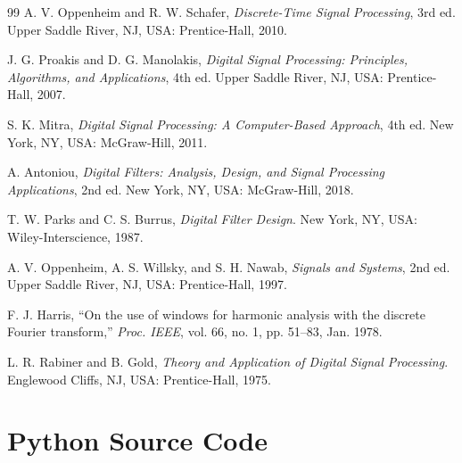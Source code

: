 \documentclass[12pt, a4paper]{article}
\begin{document}
\begin{thebibliography}{99}
A. V. Oppenheim and R. W. Schafer, \textit{Discrete-Time Signal Processing}, 3rd ed. Upper Saddle River, NJ, USA: Prentice-Hall, 2010.

J. G. Proakis and D. G. Manolakis, \textit{Digital Signal Processing: Principles, Algorithms, and Applications}, 4th ed. Upper Saddle River, NJ, USA: Prentice-Hall, 2007.

S. K. Mitra, \textit{Digital Signal Processing: A Computer-Based Approach}, 4th ed. New York, NY, USA: McGraw-Hill, 2011.

A. Antoniou, \textit{Digital Filters: Analysis, Design, and Signal Processing Applications}, 2nd ed. New York, NY, USA: McGraw-Hill, 2018.

T. W. Parks and C. S. Burrus, \textit{Digital Filter Design}. New York, NY, USA: Wiley-Interscience, 1987.

A. V. Oppenheim, A. S. Willsky, and S. H. Nawab, \textit{Signals and Systems}, 2nd ed. Upper Saddle River, NJ, USA: Prentice-Hall, 1997.

F. J. Harris, ``On the use of windows for harmonic analysis with the discrete Fourier transform,'' \textit{Proc. IEEE}, vol. 66, no. 1, pp. 51--83, Jan. 1978.

L. R. Rabiner and B. Gold, \textit{Theory and Application of Digital Signal Processing}. Englewood Cliffs, NJ, USA: Prentice-Hall, 1975.
\end{thebibliography}

\appendix
\section{Python Source Code}
\end{document}
